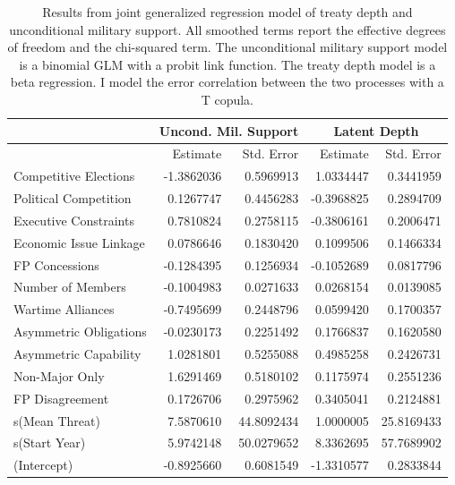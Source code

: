 \documentclass[12pt]{article}
\begin{document}
\begin{table}[ht]
\centering
\begin{tabular}{lrrrr}
 & \multicolumn{2}{c}{Uncond. Mil. Support} & \multicolumn{2}{c}{Latent Depth}\\ \hline
   & Estimate & Std. Error & Estimate & Std. Error \\ 
  \hline 
  Competitive Elections & -1.3862036 & 0.5969913 & 1.0334447 & 0.3441959 \\ 
  Political Competition & 0.1267747 & 0.4456283 & -0.3968825 & 0.2894709 \\ 
  Executive Constraints & 0.7810824 & 0.2758115 & -0.3806161 & 0.2006471 \\ 
  Economic Issue Linkage & 0.0786646 & 0.1830420 & 0.1099506 & 0.1466334 \\ 
  FP Concessions & -0.1284395 & 0.1256934 & -0.1052689 & 0.0817796 \\ 
  Number of Members & -0.1004983 & 0.0271633 & 0.0268154 & 0.0139085 \\ 
  Wartime Alliances & -0.7495699 & 0.2448796 & 0.0599420 & 0.1700357 \\ 
  Asymmetric Obligations & -0.0230173 & 0.2251492 & 0.1766837 & 0.1620580 \\ 
  Asymmetric Capability & 1.0281801 & 0.5255088 & 0.4985258 & 0.2426731 \\ 
  Non-Major Only & 1.6291469 & 0.5180102 & 0.1175974 & 0.2551236 \\ 
  FP Disagreement & 0.1726706 & 0.2975962 & 0.3405041 & 0.2124881 \\ 
  s(Mean Threat) & 7.5870610 & 44.8092434 & 1.0000005 & 25.8169433 \\ 
  s(Start Year) & 5.9742148 & 50.0279652 & 8.3362695 & 57.7689902 \\ 
  (Intercept) & -0.8925660 & 0.6081549 & -1.3310577 & 0.2833844 \\
   \hline
\end{tabular}
\caption{Results from joint generalized regression model of treaty depth and unconditional military support. 
                     All smoothed terms report the effective degrees of freedom and the chi-squared term. 
                     The unconditional military support model is a binomial GLM with a probit link function. 
                     The treaty depth model is a beta regression. 
                     I model the error correlation between the two processes with a T copula.} 
\label{tab:gjrm-res-split}
\end{table}
\end{document}
